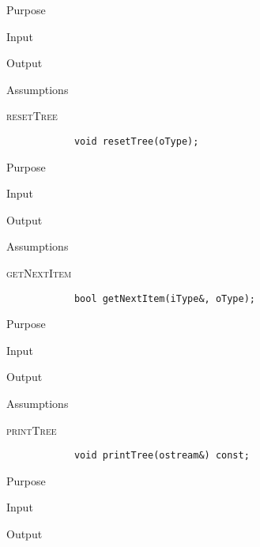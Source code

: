 \documentclass[pdftex, 12pt]{article}
\begin{document}
\begin{description}
\begin{description}
			\item{Purpose}

			\item{Input}

			\item{Output}

			\item{Assumptions}

		\end{description}
	\item{\textsc{resetTree}}
		\begin{lstlisting}
			void resetTree(oType);
		\end{lstlisting}
		\begin{description}

			\item{Purpose}

			\item{Input}

			\item{Output}

			\item{Assumptions}

		\end{description}
	\item{\textsc{getNextItem}}
		\begin{lstlisting}
			bool getNextItem(iType&, oType);
		\end{lstlisting}
		\begin{description}

			\item{Purpose}

			\item{Input}

			\item{Output}

			\item{Assumptions}

		\end{description}
	\item{\textsc{printTree}}
		\begin{lstlisting}
			void printTree(ostream&) const;
		\end{lstlisting}
		\begin{description}

			\item{Purpose}

			\item{Input}

			\item{Output}


\end{description}
\end{description}
\end{document}
